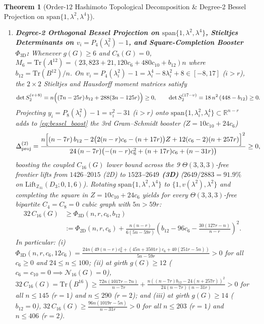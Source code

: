 \documentclass[10pt,a4paper]{article}
\newtheorem{theorem}{Theorem}[section]
\theoremstyle{definition}
\theoremstyle{remark}
\begin{document}
\begin{theorem}[Order-$12$ Hashimoto Topological Decomposition \& Degree-2 Bessel Projection on $\mathrm{span}\{1, \lambda^2, \lambda^4\}$]
\begin{enumerate}[label=(\alph*),nosep]
  \item \textbf{Degree-2 Orthogonal Bessel Projection on $\mathrm{span}\{1, \lambda^2, \lambda^4\}$, Stieltjes Determinants on $v_i = P_4(\lambda_i^2)-1$, and Square-Completion Booster $\Phi_{\mathrm{3D}}$:}
  Whenever $g(G) \ge 6$ and $C_8(G) = 0$, $M_6 = \mathrm{Tr}(A^{12}) = (23{,}823 + 21{,}120 c_6 + 480 c_{10} + b_{12}) n$ where $b_{12} = \mathrm{Tr}(B^{12})/n$. On $v_i = P_4(\lambda_i^2) - 1 = \lambda_i^4 - 8\lambda_i^2 + 8 \in [-8, 17]$ ($i > r$), the $2 \times 2$ Stieltjes and Hausdorff moment matrices satisfy
  \begin{equation}\label{eq:stieltjes_v}
    \det S_2^{(v+8)} = n\Bigl((7n - 25r)\,b_{12} + 288(3n - 125r)\Bigr) \ge 0, \qquad \det S_2^{(17-v)} = 18\,n^2\,(448 - b_{12}) \ge 0.
  \end{equation}
  Projecting $y_i = P_8(\lambda_i^2) - 1 = v_i^2 - 31$ ($i > r$) onto $\mathrm{span}\{1, \lambda_i^2, \lambda_i^4\} \subset \mathbb{R}^{n-r}$ adds to \eqref{eq:bessel_boost} the 3rd Gram--Schmidt booster ($Z = 10 c_{10} + 24 c_6$)
  \begin{equation}\label{eq:bessel_3d_boost}
    \Delta_{\mathrm{proj}}^{(2)} = \frac{n \Bigl[(n - 7r)\,b_{12} - 2\bigl(2(n - r) c_6 - (n + 17 r)\bigr)Z + 12(c_6 - 2)(n + 257 r)\Bigr]^2}{24\,(n - 7r)\bigl(-(n - r) c_6^2 + (n + 17 r) c_6 + (n - 31 r)\bigr)} \ge 0,
  \end{equation}
  boosting the coupled $C_{16}(G)$ lower bound across the 9 $\Theta(3,3,3)$-free frontier lifts from $1426$--$2015$ (2D) to \textbf{$1523$--$2649$ (3D)} ($2649/2883 = 91.9\%$ on $\mathrm{Lift}_{\mathbb{Z}_{31}}(D_3; 0, 1, 6)$). Rotating $\mathrm{span}\{1, \lambda^2, \lambda^4\}$ to $\{1, v(\lambda^2), \lambda^2\}$ and completing the square in $Z = 10 c_{10} + 24 c_6$ yields for every $\Theta(3,3,3)$-free bipartite $C_4 = C_8 = 0$ cubic graph with $5n > 59r$:
  \begin{equation}\label{eq:phi_3d}
  \begin{aligned}
    32\,C_{16}(G) &\ge \Phi_{\mathrm{3D}}(n, r, c_6, b_{12}) \\
    &:= \Phi_{\mathrm{2D}}(n, r, c_6) + \frac{n(n - r)}{6(5n - 59r)}\left(b_{12} - 96 c_6 - \frac{30(127 r - n)}{n - r}\right)^2.
  \end{aligned}
  \end{equation}
  In particular: (i) $\Phi_{\mathrm{3D}}(n, r, c_6, 12 c_6) = \frac{24n(49(n-r)c_6^2 + (45n+3501r)c_6 + 40(251r-5n))}{5n - 59r} > 0$ for all $c_6 \ge 0$ and $24 \le n \le 100$; (ii) at girth $g(G) \ge 12$ ($c_6 = c_{10} = 0 \implies \mathcal{N}_{16}(G) = 0$), $32\,C_{16}(G) = \mathrm{Tr}(B^{16}) \ge \frac{72n(1017r - 7n)}{n - 7r} + \frac{n((n-7r)b_{12} - 24(n+257r))^2}{24(n-7r)(n-31r)} > 0$ for all $n \le 145$ ($r=1$) and $n \le 290$ ($r=2$); and (iii) at girth $g(G) \ge 14$ ($b_{12} = 0$), $32\,C_{16}(G) \ge \frac{96n(1019r - 5n)}{n - 31r} > 0$ for all $n \le 203$ ($r=1$) and $n \le 406$ ($r=2$).
\end{enumerate}
\end{theorem}
\end{document}
